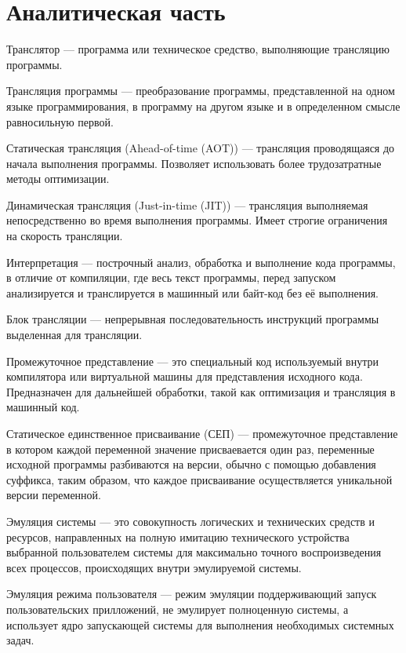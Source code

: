 \section{Аналитическая часть}
 
Транслятор --- программа или техническое средство, выполняющие трансляцию программы. \cite{translate}
 
Трансляция программы --- преобразование программы, представленной на одном языке программирования, в программу на другом языке и в определенном смысле равносильную первой. \cite{translate}
 
Статическая трансляция (Ahead-of-time (AOT)) --- трансляция проводящаяся до начала выполнения программы. Позволяет использовать более трудозатратные методы оптимизации.

Динамическая трансляция (Just-in-time (JIT)) --- трансляция выполняемая непосредственно во время выполнения программы. Имеет строгие ограничения на скорость трансляции.

Интерпретация --- построчный анализ, обработка и выполнение кода программы, в отличие от компиляции, где весь текст программы, перед запуском анализируется и транслируется в машинный или байт-код без её выполнения. \cite{interpret}
 
Блок трансляции --- непрерывная последовательность инструкций программы выделенная для трансляции.
 
Промежуточное представление ---  это специальный код используемый внутри компилятора или виртуальной машины для представления исходного кода. Предназначен для дальнейшей обработки, такой как оптимизация и трансляция в машинный код.
 
Статическое единственное присваивание (СЕП) --- промежуточное представление в котором каждой переменной значение присваевается один раз, переменные исходной программы разбиваются на версии, обычно с помощью добавления суффикса, таким образом, что каждое присваивание осуществляется уникальной версии переменной.

Эмуляция системы --- это совокупность логических и технических средств и ресурсов, направленных на полную имитацию технического устройства выбранной пользователем системы для максимально точного воспроизведения всех процессов, происходящих внутри эмулируемой системы. 

Эмуляция режима пользователя --- режим эмуляции поддерживающий запуск пользовательских прилложений, не эмулирует полноценную системы, а использует ядро запускающей системы для выполнения необходимых системных задач.
  
